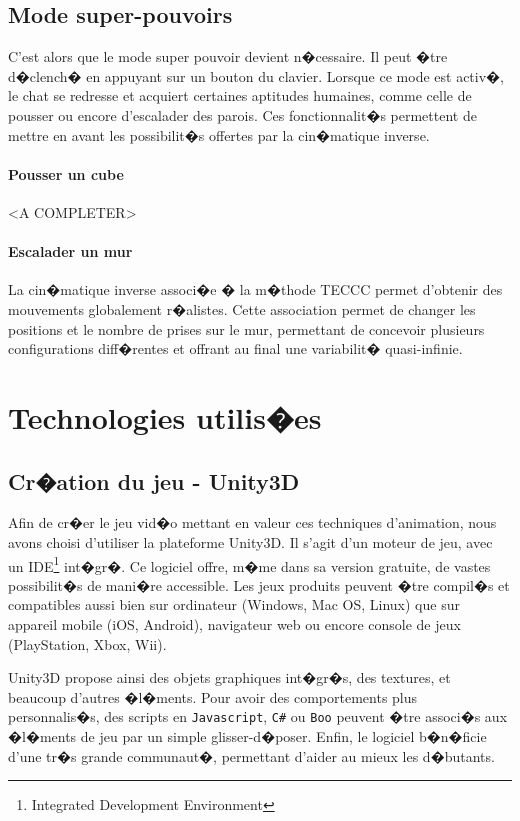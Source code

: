 \documentclass[a4paper,11pt]{article}
\begin{document}
\subsection{Mode super-pouvoirs}
C'est alors que le mode super pouvoir devient n�cessaire. Il peut �tre d�clench� en appuyant sur un bouton du clavier. Lorsque ce mode est activ�, le chat se redresse et acquiert certaines aptitudes humaines, comme celle de pousser ou encore d'escalader des parois. Ces fonctionnalit�s permettent de mettre en avant les possibilit�s offertes par la cin�matique inverse.

\paragraph{Pousser un cube}
<A COMPLETER>
\paragraph{Escalader un mur}
La cin�matique inverse associ�e � la m�thode TECCC permet d'obtenir des mouvements globalement r�alistes. Cette association permet de changer les positions et le nombre de prises sur le mur, permettant de concevoir plusieurs configurations diff�rentes et offrant au final une variabilit� quasi-infinie.

\section{Technologies utilis�es}
\subsection{Cr�ation du jeu - Unity3D}

Afin de cr�er le jeu vid�o mettant en valeur ces techniques d'animation, nous avons choisi d'utiliser la plateforme Unity3D. Il s'agit d'un moteur de jeu, avec un IDE\footnote{Integrated Development Environment} int�gr�. Ce logiciel offre, m�me dans sa version gratuite, de vastes possibilit�s de mani�re accessible. Les jeux produits peuvent �tre compil�s et compatibles aussi bien sur ordinateur (Windows, Mac OS, Linux) que sur appareil mobile (iOS, Android), navigateur web ou encore console de jeux (PlayStation, Xbox, Wii).

Unity3D propose ainsi des objets graphiques int�gr�s, des textures, et beaucoup d'autres �l�ments. Pour avoir des comportements plus personnalis�s, des scripts en \texttt{Javascript}, \texttt{C\#} ou \texttt{Boo} peuvent �tre associ�s aux �l�ments de jeu par un simple glisser-d�poser. Enfin, le logiciel b�n�ficie d'une tr�s grande communaut�, permettant d'aider au mieux les d�butants. 
\end{document}
